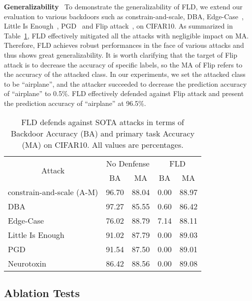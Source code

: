 \noindent\textbf{Generalizability}~
To demonstrate the generalizability of FLD, we extend our evaluation to various backdoors such as constrain-and-scale, DBA, Edge-Case~\cite{tails}, Little Is Enough~\cite{littleisenough}, PGD~\cite{tails} and Flip attack~\cite{flip}, on CIFAR10. As summarized in Table~\ref{tab:attack}, FLD effectively mitigated all the attacks with negligible impact on MA. Therefore, FLD achieves robust performances in the face of various attacks and thus shows great generalizability.
It is worth clarifying that the target of Flip attack is to decrease the accuracy of specific labels, so the MA of Flip refers to the accuracy of the attacked class. In our experiments, we set the attacked class to be ``airplane'', and the attacker succeeded to decrease the prediction accuracy of ``airplane'' to 0.5\%. FLD effectively defended against Flip attack and present the prediction accuracy of ``airplane'' at 96.5\%.


\begin{table}[htbp]
  \centering
  \caption{FLD defends against SOTA attacks in terms of Backdoor Accuracy (BA) and primary task Accuracy (MA) on CIFAR10. All values are percentages.}
    \small 
    \begin{tabular}{l|cc|cc}
    \hline
    \multicolumn{1}{c|}{\multirow{2}[4]{*}{Attack}} & \multicolumn{2}{c|}{No Denfense } & \multicolumn{2}{c}{FLD} \bigstrut\\
\cline{2-5}          & \multicolumn{1}{c|}{BA} & MA    & \multicolumn{1}{c|}{BA} & MA \bigstrut\\
    \hline
    constrain-and-scale (A-M) & 96.70  & 88.04  & 0.00  & 88.97  \bigstrut\\
\cline{1-1}    DBA   & 97.27  & 85.55  & 0.60  & 86.42  \bigstrut\\
\cline{1-1}    Edge-Case & 76.02  & 88.79  & 7.14  & 88.11  \bigstrut\\
\cline{1-1}    Little Is Enough & 91.02  & 87.79  & 0.00  & 89.03  \bigstrut\\
\cline{1-1}    PGD   & 91.54  & 87.50  & 0.00  & 89.01  \bigstrut\\
\cline{1-1}    Neurotoxin   &    86.42   & 88.56  &    0.00   & 89.08  \bigstrut\\
    \hline
    \end{tabular}%
  \label{tab:attack}%
\end{table}%





\subsection{Ablation Tests}

